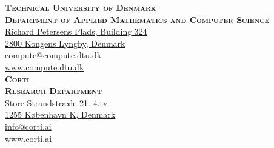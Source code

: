 
\thispagestyle{empty} %

\vspace*{\fill}
\small\sffamily
\noindent
\textsc{\textbf{Technical University of Denmark}}\\
\textsc{\textbf{Department of Applied Mathematics and Computer Science}}
\smallskip\\
\href{https://goo.gl/maps/Dx6rNjGT9Ad5xKgZ6}{%
Richard Petersens Plads, Building 324\\
2800 Kongens Lyngby, Denmark}\\
\href{mailto:compute@compute.dtu.dk}{compute@compute.dtu.dk}\\
\href{www.compute.dtu.dk}{www.compute.dtu.dk}
\bigskip\\
\noindent
\textsc{\textbf{Corti}}\\
\textsc{\textbf{Research Department}}
\smallskip\\
\href{https://goo.gl/maps/X7en4p8vaHkfVuyJ7}{%
Store Strandstræde 21. 4.tv\\
1255 København K, Denmark}\\
\href{mailto:info@corti.ai}{info@corti.ai}\\
\href{www.corti.ai}{www.corti.ai}\\

\normalsize
\normalfont
